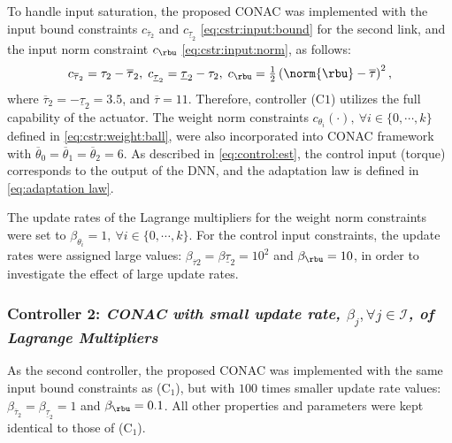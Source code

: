 \documentclass[journal]{IEEEtran}
\begin{document}
To handle input saturation, the proposed CONAC was implemented with the input bound constraints $c_{\overline\tau_2}$ and $c_{\underline\tau_2}$ \eqref{eq:cstr:input:bound} for the second link, and the input norm constraint $c_{\rbu}$ \eqref{eq:cstr:input:norm}, as follows:
\begin{equation}
    c_{\overline\tau_2}     
    =
    \tau_2-\overline\tau_2
    ,
    \;
    c_{\underline\tau_2} 
    =
    \underline\tau_2-\tau_2
    ,
    \;
    c_{\rbu}
    =
    \tfrac{1}{2}
    \left(
        \norm{\rbu}-\overline\tau
    \right)^2 
    ,
    \label{eq:sim:cstr:CONAC}
\end{equation}
where $\overline\tau_2=-\underline{\tau}_2=3.5$, and $\overline\tau=11$.
Therefore, controller (C$1$) utilizes the full capability of the actuator.
The weight norm constraints $c_{\theta_i}(\cdot),\ \forall i\in\{0,\cdots,k\}$ defined in \eqref{eq:cstr:weight:ball}, were also incorporated into CONAC framework with $\overline\theta_0=\overline\theta_1=\overline\theta_2=6$.
As described in \eqref{eq:control:est}, the control input (torque) corresponds to the output of the DNN, and the adaptation law is defined in \eqref{eq:adaptation law}.

The update rates of the Lagrange multipliers for the weight norm constraints were set to $\beta_{\theta_i}=1,\ \forall i\in\{0,\cdots,k\}$.
For the control input constraints, the update rates were assigned large values: $\beta_{\overline{\tau}2} = \beta{\underline{\tau}_2} = 10^2$ and $\beta_{\rbu} = 10$, in order to investigate the effect of large update rates.

\subsubsection*{Controller 2:  \textit{CONAC with small update rate, $\beta_j,\forall j\in\mathcal{I}$, of Lagrange Multipliers}}

As the second controller, the proposed CONAC was implemented with the same input bound constraints as (C$_1$), but with $100$ times smaller update rate values: $\beta_{\overline{\tau}_2}=\beta_{\underline{\tau}_2}=1$ and $\beta_{\rbu}=0.1$.
All other properties and parameters were kept identical to those of (C$_1$).

\end{document}
